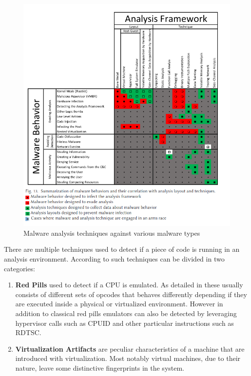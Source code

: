 \noindent
\begin{figure}[htp]
\centering
\includegraphics[width=\linewidth]{images/mal-fram.png}
\caption{Malware analysis techniques against various malware types}
\label{fig:mfrm}
\end{figure}

There are multiple techniques used to detect if a piece of code is running in an analysis environment. According to \cite{9018111} such techniques can be divided in two categories:

\begin{enumerate}
    \item \textbf{Red Pills} used to detect if a CPU is emulated. As detailed in \cite{bruschi} these usually consists of different sets of opcodes that behaves differently depending if they are executed inside a physical or virtualized environment. However in addition to classical red pills emulators can also be detected by leveraging hypervisor calls such as CPUID and other particular instructions such as RDTSC.
    \item \textbf{Virtualization Artifacts} are peculiar characteristics of a machine that are introduced with virtualization. Most notably virtual machines, due to their nature, leave some distinctive fingerprints in the system.
\end{enumerate}

